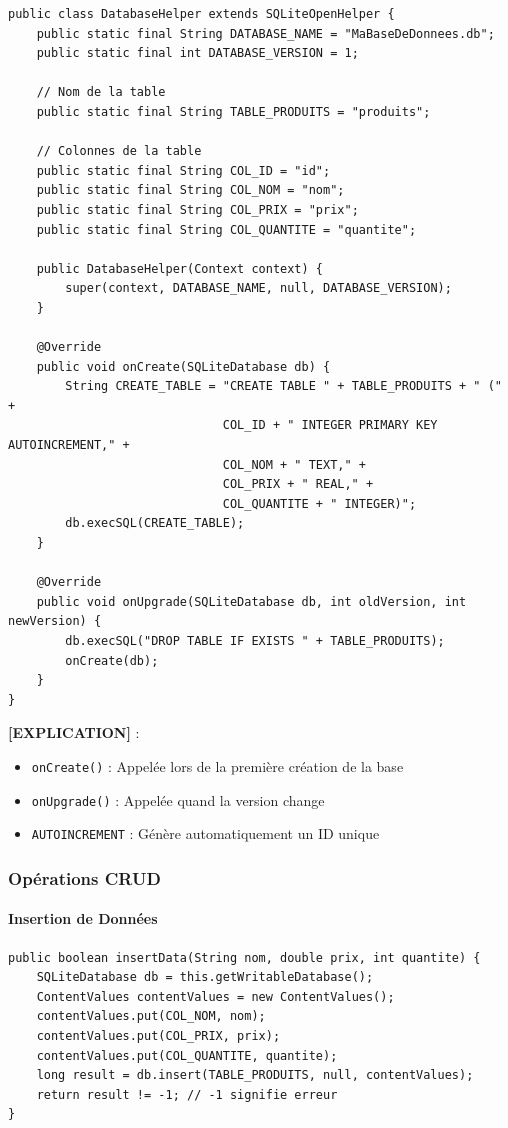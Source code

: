 \documentclass[11pt,a4paper]{article}
\begin{document}
\begin{lstlisting}
public class DatabaseHelper extends SQLiteOpenHelper {
    public static final String DATABASE_NAME = "MaBaseDeDonnees.db";
    public static final int DATABASE_VERSION = 1;
    
    // Nom de la table
    public static final String TABLE_PRODUITS = "produits";
    
    // Colonnes de la table
    public static final String COL_ID = "id";
    public static final String COL_NOM = "nom";
    public static final String COL_PRIX = "prix";
    public static final String COL_QUANTITE = "quantite";
    
    public DatabaseHelper(Context context) {
        super(context, DATABASE_NAME, null, DATABASE_VERSION);
    }
    
    @Override
    public void onCreate(SQLiteDatabase db) {
        String CREATE_TABLE = "CREATE TABLE " + TABLE_PRODUITS + " (" +
                              COL_ID + " INTEGER PRIMARY KEY AUTOINCREMENT," +
                              COL_NOM + " TEXT," +
                              COL_PRIX + " REAL," +
                              COL_QUANTITE + " INTEGER)";
        db.execSQL(CREATE_TABLE);
    }
    
    @Override
    public void onUpgrade(SQLiteDatabase db, int oldVersion, int newVersion) {
        db.execSQL("DROP TABLE IF EXISTS " + TABLE_PRODUITS);
        onCreate(db);
    }
}
\end{lstlisting}

\textbf{[EXPLICATION]} :
\begin{itemize}
    \item \texttt{onCreate()} : Appelée lors de la première création de la base
    \item \texttt{onUpgrade()} : Appelée quand la version change
    \item \texttt{AUTOINCREMENT} : Génère automatiquement un ID unique
\end{itemize}

\subsubsection{Opérations CRUD}

\paragraph{Insertion de Données}

\begin{lstlisting}
public boolean insertData(String nom, double prix, int quantite) {
    SQLiteDatabase db = this.getWritableDatabase();
    ContentValues contentValues = new ContentValues();
    contentValues.put(COL_NOM, nom);
    contentValues.put(COL_PRIX, prix);
    contentValues.put(COL_QUANTITE, quantite);
    long result = db.insert(TABLE_PRODUITS, null, contentValues);
    return result != -1; // -1 signifie erreur
}
\end{lstlisting}
\end{document}
